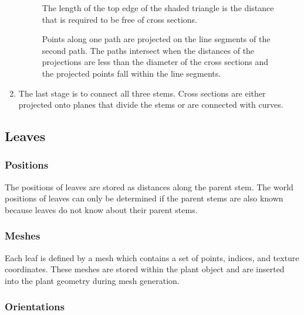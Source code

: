 \documentclass[10pt]{article}
\begin{document}
\begin{enumerate}
\begin{figure}[H]
 \begin{minipage}[b]{0.46\textwidth}
  \centering
  
  \caption{The length of the top edge of the shaded triangle is the distance that is required to be free of cross sections.} \label{fig:forkside}
 \end{minipage}
 \hfill
 \begin{minipage}[b]{0.46\textwidth}
  \centering
  
  \caption{Points along one path are projected on the line segments of the second path. The paths intersect when the distances of the projections are less than the diameter of the cross sections and the projected points fall within the line segments.} \label{fig:path}
 \end{minipage}
\end{figure}

\item The last stage is to connect all three stems. Cross sections are either projected onto planes that divide the stems or are connected with curves.
\end{enumerate}

\subsection{Leaves}

\subsubsection{Positions}

The positions of leaves are stored as distances along the parent stem. The world positions of leaves can only be determined if the parent stems are also known because leaves do not know about their parent stems.

\subsubsection{Meshes}

Each leaf is defined by a mesh which contains a set of points, indices, and texture coordinates. These meshes are stored within the plant object and are inserted into the plant geometry during mesh generation.

\subsubsection{Orientations}
\end{document}
